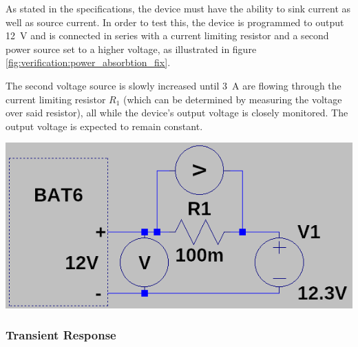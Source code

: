 \begin{minipage}{0.5\textwidth}
    As  stated  in  the  specifications,  the device  must  have  the  ability
    to  sink   current  as  well  as   source  current.   In  order   to  test
    this,  the   device  is  programmed   to  output  \SI{12}{\volt}   and  is
    connected  in  series  with  a  current limiting  resistor  and  a  second
    power  source  set   to  a  higher  voltage,  as   illustrated  in  figure
    \ref{fig:verification:power_absorbtion_fix}.

    The second  voltage source is  slowly increased until  \SI{3}{\ampere} are
    flowing  through  the  current  limiting  resistor  $R_1$  (which  can  be
    determined by  measuring the  voltage over said  resistor), all  while the
    device's  output  voltage  is  closely monitored. The  output  voltage  is
    expected to remain constant.
\end{minipage}
\begin{minipage}{0.5\textwidth}
    \centering
    \includegraphics[width=.9\textwidth]{images/sim/power-absorbtion-fixture.png}
    \label{fig:verification:power_absorbtion_fix}
\end{minipage}



\subsubsection{Transient Response}


